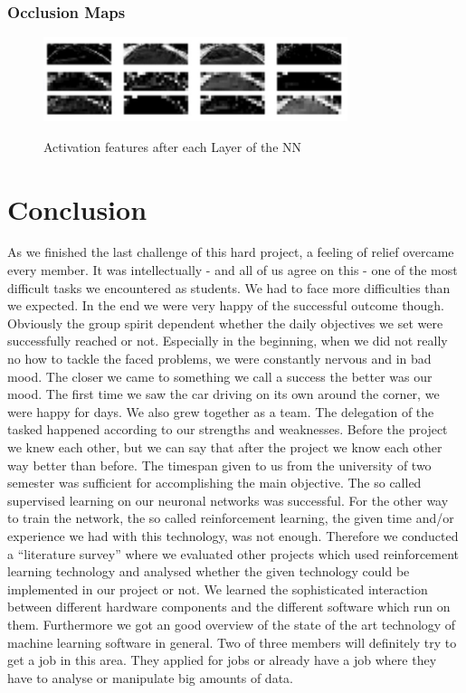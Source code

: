 \documentclass[journal]{IEEEtran}
\begin{document}
\subsubsection{Occlusion Maps}
\begin{figure}
  \begin{center}
  \includegraphics[width=3.5in]{photo/activations.png}\\
  \caption{Activation features after each Layer of the NN  \cite{master} }\label{activations}
  \end{center}
\end{figure}

\section{Conclusion}
As we finished the last challenge of this hard project, a feeling of relief overcame every member. It was intellectually - and all of us agree on this - one of the most difficult tasks we encountered as students. We had to face more difficulties than we expected. In the end we were very happy of the successful outcome though.
Obviously the group spirit dependent whether the daily objectives we set were successfully reached or not. Especially in the beginning, when we did not really no how to tackle the faced problems, we were constantly nervous and in  bad mood. The closer we came to something we call a success the better was our mood. The first time we saw the car driving on its own around the corner, we were happy for days.
We also grew together as a team. The delegation of the tasked happened according to our strengths and weaknesses. Before the project we knew each other, but we can say that after the project we know each other way better than before.
The timespan given to us from the university of two semester was sufficient for accomplishing the main objective. The so called supervised learning on our neuronal networks was successful. For the other way to train the network, the so called reinforcement learning, the given time and/or experience we had with this technology, was not enough. Therefore we conducted a “literature survey” where we evaluated other projects which used reinforcement learning technology and analysed whether the given technology could be implemented in our project or not. 
We learned the sophisticated interaction between different hardware components and the different software which run on them. Furthermore we got an good overview of the state of the art technology of machine learning software in general.
Two of three members will definitely try to get a job in this area. They applied for jobs or already have a job where they have to analyse or manipulate big amounts of data.
\end{document}
